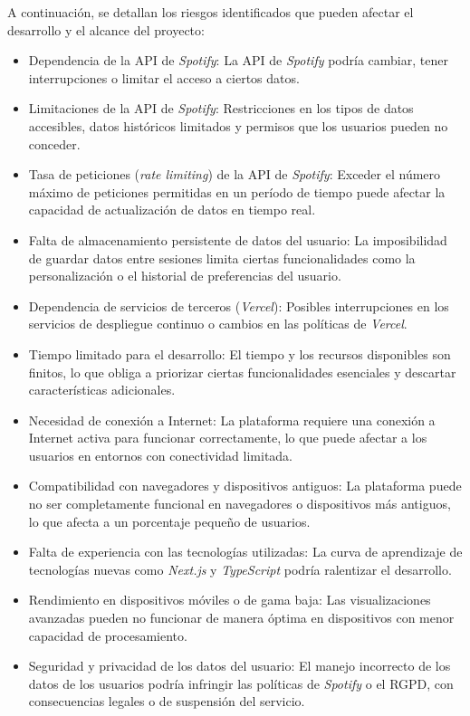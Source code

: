 A continuación, se detallan los riesgos identificados que pueden afectar el desarrollo y el alcance del proyecto:

\begin{itemize}
    \item Dependencia de la API de \textit{Spotify}: La API de \textit{Spotify} podría cambiar, tener interrupciones o limitar el acceso a ciertos datos.

    \item Limitaciones de la API de \textit{Spotify}: Restricciones en los tipos de datos accesibles, datos históricos limitados y permisos que los usuarios pueden no conceder.

    \item Tasa de peticiones (\textit{rate limiting}) de la API de \textit{Spotify}: Exceder el número máximo de peticiones permitidas en un período de tiempo puede afectar la capacidad de actualización de datos en tiempo real.

    \item Falta de almacenamiento persistente de datos del usuario: La imposibilidad de guardar datos entre sesiones limita ciertas funcionalidades como la personalización o el historial de preferencias del usuario.

    \item Dependencia de servicios de terceros (\textit{Vercel}): Posibles interrupciones en los servicios de despliegue continuo o cambios en las políticas de \textit{Vercel}.

    \item Tiempo limitado para el desarrollo: El tiempo y los recursos disponibles son finitos, lo que obliga a priorizar ciertas funcionalidades esenciales y descartar características adicionales.

    \item Necesidad de conexión a Internet: La plataforma requiere una conexión a Internet activa para funcionar correctamente, lo que puede afectar a los usuarios en entornos con conectividad limitada.

    \item Compatibilidad con navegadores y dispositivos antiguos: La plataforma puede no ser completamente funcional en navegadores o dispositivos más antiguos, lo que afecta a un porcentaje pequeño de usuarios.

    \item Falta de experiencia con las tecnologías utilizadas: La curva de aprendizaje de tecnologías nuevas como \textit{Next.js} y \textit{TypeScript} podría ralentizar el desarrollo.

    \item Rendimiento en dispositivos móviles o de gama baja: Las visualizaciones avanzadas pueden no funcionar de manera óptima en dispositivos con menor capacidad de procesamiento.

    \item Seguridad y privacidad de los datos del usuario: El manejo incorrecto de los datos de los usuarios podría infringir las políticas de \textit{Spotify} o el RGPD, con consecuencias legales o de suspensión del servicio.

\end{itemize}


